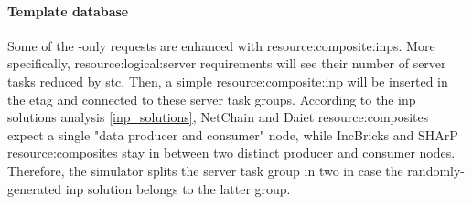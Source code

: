\paragraph{Template database}
Some of the -only requests are enhanced with \glspl{resource:composite:inp}.
More specifically, \gls{resource:logical:server} requirements will see their number of server tasks reduced by \gls{stc}.
Then, a simple \gls{resource:composite:inp} will be inserted in the \gls{etag} and connected to these server task groups.
According to the \gls{inp} solutions analysis \autoref{inp_solutions}, NetChain \cite{netchain} and Daiet \cite{daiet} \glspl{resource:composite} expect a single "data producer and consumer" node, while IncBricks \cite{incbricks} and SHArP \cite{sharp} \glspl{resource:composite} stay in between two distinct producer and consumer nodes.
Therefore, the simulator splits the server task group in two in case the randomly-generated \gls{inp} solution belongs to the latter group.
